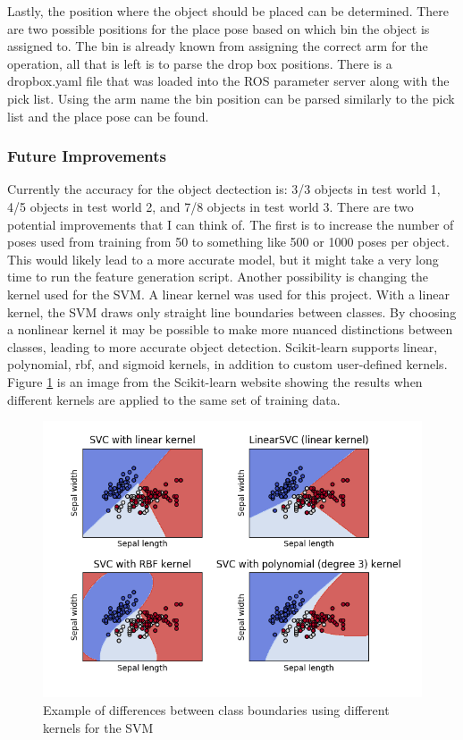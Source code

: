 \documentclass{article}
\begin{document}
Lastly, the position where the object should be placed can be determined. There are two possible positions for the place pose based on which bin the object is assigned to. The bin is already known from assigning the correct arm for the operation, all that is left is to parse the drop box positions. There is a dropbox.yaml file that was loaded into the ROS parameter server along with the pick list. Using the arm name the bin position can be parsed similarly to the pick list and the place pose can be found.

\subsubsection{Future Improvements}
Currently the accuracy for the object dectection is: 3/3 objects in test world 1, 4/5 objects in test world 2, and 7/8 objects in test world 3. There are two potential improvements that I can think of. The first is to increase the number of poses used from training from 50 to something like 500 or 1000 poses per object. This would likely lead to a more accurate model, but it might take a very long time to run the feature generation script. Another possibility is changing the kernel used for the SVM. A linear kernel was used for this project. With a linear kernel, the SVM draws only straight line boundaries between classes. By choosing a nonlinear kernel it may be possible to make more nuanced distinctions between classes, leading to more accurate object detection. Scikit-learn supports linear, polynomial, rbf, and sigmoid kernels, in addition to custom user-defined kernels. Figure \ref{fig:kernel} is an image from the Scikit-learn website showing the results when different kernels are applied to the same set of training data.

\begin{figure}[H]
    \includegraphics[width=\linewidth]{SVMkernel.png}
    \caption{Example of differences between class boundaries using different kernels for the SVM}
    \label{fig:kernel}
\end{figure}
\end{document}
